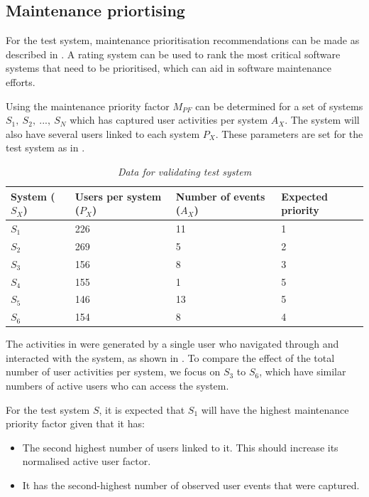 \subsection{Maintenance priortising}
For the test system, maintenance prioritisation recommendations can be made as described in . A rating system can be used to rank the most critical software systems that need to be prioritised, which can aid in software maintenance efforts.\par Using  the maintenance priority factor $M_{PF}$ can be determined for a set of systems {$S_1,~S_2,~...,~S_N$} which has captured user activities per system $A_X$. The system will also have several users linked to each system $P_X$. These parameters are set for the test system as in .

\begin{table}[!htb]
	\centering
	\caption[Data for validating test system]
	{\textit{Data for validating test system}}
	\label{tbl:ch3_testData}
	\begin{tabularx}{\textwidth}{XXXX}
		\toprule
		\textbf{System ($S_X$)} & \textbf{Users per system ($P_X$)} & \textbf{Number of events ($A_X$)} & \textbf{Expected priority} \\
		\midrule
		\rowcolor{lightgray}
		$S_1$ & 226 & 11 & 1 \\
		$S_2$ & 269 & 5 & 2 \\
		\rowcolor{lightgray}
		$S_3$ & 156 & 8 & 3 \\
		$S_4$ & 155 & 1 & 5 \\
		\rowcolor{lightgray}
		$S_5$ & 146 & 13 & 5 \\
		$S_6$ & 154 & 8 & 4 \\
		\bottomrule
	\end{tabularx}
\end{table}

The activities in  were generated by a single user who navigated through and interacted with the system, as shown in . To compare the effect of the total number of user activities per system, we focus on $S_3$ to $S_6$, which have similar numbers of active users who can access the system.\par For the test system $S$, it is expected that $S_1$ will have the highest maintenance priority factor given that it has:

\begin{itemize}
	\item The second highest number of users linked to it. This should increase its normalised active user factor.
	\item It has the second-highest number of observed user events that were captured.
\end{itemize}

